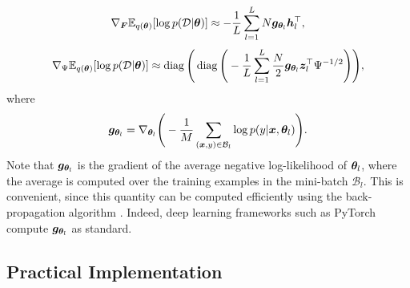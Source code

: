 \documentclass[10pt]{article} %
\newcommand{\diag}{\mathop{\mathrm{diag}}}
\begin{document}
\begin{equation}
	 \nabla_{\bm{F}} \mathbb{E}_{q({\bm{\theta}})} [\log p(\mathcal{D} | {\bm{\theta}})]
	 \approx -\frac{1}{L} \sum_{l=1}^{L} N {\bm{g}}_{{\bm{\theta}}_l} {\bm{h}}_l^\top,
\end{equation}
\begin{equation}\label{eqn:grad_likelihood_wrt_psi}
	 \nabla_\Psi \E_{q(\vtheta)} [\log p(\mathcal{D} | \vtheta)] \approx \diag\Bigg( \diag\Bigg( -\frac{1}{L} \sum_{l=1}^{L} \frac{N}{2} \vg_{\vtheta_l} \vz_l^\top \Psi^{-1/2} \Bigg)\Bigg),
\end{equation}
where
\begin{equation}
	{\bm{g}}_{{\bm{\theta}}_l} = \nabla_{{\bm{\theta}}_l} \Bigg( -\frac{1}{M} \sum_{({\bm{x}}, y) \in \mathcal{B}_l} \log p(y | {\bm{x}}, {\bm{\theta}}_l) \Bigg).
\end{equation}
Note that ${\bm{g}}_{{\bm{\theta}}_l}$ is the gradient of the average negative log-likelihood of ${\bm{\theta}}_l$, where the average is computed over the training examples in the mini-batch $\mathcal{B}_l$. This is convenient, since this quantity can be computed efficiently using the back-propagation algorithm \citep{rumelhart1986}. Indeed, deep learning frameworks such as PyTorch \citep{paszke2019} compute ${\bm{g}}_{{\bm{\theta}}_l}$ as standard. 


\subsection{Practical Implementation}
\end{document}
